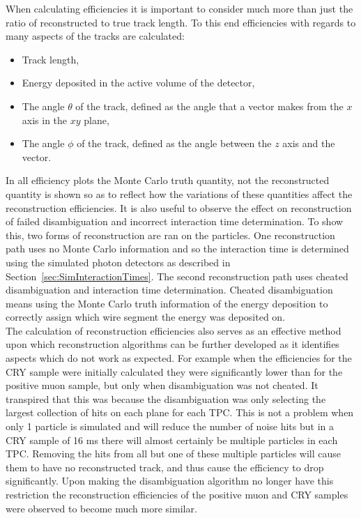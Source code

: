 When calculating efficiencies it is important to consider much more than just the ratio of reconstructed to true track length. To this end efficiencies with regards to many aspects of the tracks are calculated:
\begin{itemize}
\item Track length,
\item Energy deposited in the active volume of the detector,
\item The angle $\theta$ of the track, defined as the angle that a vector makes from the $x$ axis in the $xy$ plane,
\item The angle $\phi$ of the track, defined as the angle between the $z$ axis and the vector.
\end{itemize}
In all efficiency plots the Monte Carlo truth quantity, not the reconstructed quantity is shown so as to reflect how the variations of these quantities affect the reconstruction efficiencies. It is also useful to observe the effect on reconstruction of failed disambiguation and incorrect interaction time determination. To show this, two forms of reconstruction are ran on the particles. One reconstruction path uses no Monte Carlo information and so the interaction time is determined using the simulated photon detectors as described in Section~\ref{sec:SimInteractionTimes}. The second reconstruction path uses cheated disambiguation and interaction time determination. Cheated disambiguation means using the Monte Carlo truth information of the energy deposition to correctly assign which wire segment the energy was deposited on. \\

The calculation of reconstruction efficiencies also serves as an effective method upon which reconstruction algorithms can be further developed as it identifies aspects which do not work as expected. For example when the efficiencies for the CRY sample were initially calculated they were significantly lower than for the positive muon sample, but only when disambiguation was not cheated. It transpired that this was because the disambiguation was only selecting the largest collection of hits on each plane for each TPC. This is not a problem when only 1 particle is simulated and will reduce the number of noise hits but in a CRY sample of 16 ms there will almost certainly be multiple particles in each TPC. Removing the hits from all but one of these multiple particles will cause them to have no reconstructed track, and thus cause the efficiency to drop significantly. Upon making the disambiguation algorithm no longer have this restriction the reconstruction efficiencies of the positive muon and CRY samples were observed to become much more similar. \\


